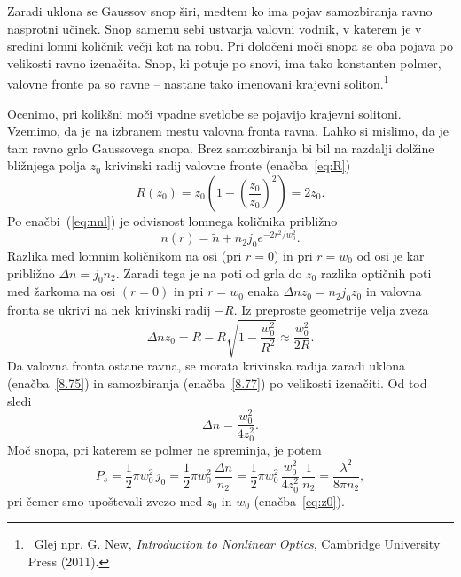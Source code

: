 Zaradi uklona se Gaussov snop širi, medtem ko ima pojav samozbiranja ravno nasprotni
učinek. Snop samemu sebi ustvarja valovni vodnik, v katerem je v sredini lomni količnik 
večji kot na robu. Pri določeni moči snopa se oba pojava po
velikosti ravno izenačita. Snop, ki potuje po snovi, ima tako konstanten polmer, 
valovne fronte pa so ravne -- nastane tako imenovani krajevni soliton.\footnote{~Glej npr. G. New, {\it Introduction
to Nonlinear Optics}, Cambridge University Press (2011).}

Ocenimo, pri kolikšni moči vpadne svetlobe se pojavijo krajevni solitoni. 
Vzemimo, da je na izbranem mestu valovna fronta ravna. Lahko si mislimo,
da je tam ravno grlo Gaussovega snopa. Brez samozbiranja bi bil na razdalji
dolžine bližnjega polja $z_{0}$ krivinski radij valovne fronte (enačba~\ref{eq:R})
\begin{equation}
R(z_{0})=z_{0}\left( 1+\left(\frac{z_{0}}{z_{0}}\right)^{2}\right)=2z_{0}.
\label{8.75}
\end{equation}
Po enačbi~(\ref{eq:nnl}) je odvisnost lomnega količnika približno
\begin{equation}
n(r)=\tilde{n}+n_2 j_0 e^{-2r^2/w_0^2}.
\label{8.76}
\end{equation}
Razlika med lomnim količnikom na osi (pri $r=0$) in pri $r = w_{0}$ 
od osi je kar približno $\Delta n= j_{0} n_{2}$.
Zaradi tega je na poti od grla do $z_0$ razlika optičnih poti med žarkoma na osi $(r=0)$ in 
pri $r= w_{0}$ enaka $\Delta nz_{0} = n_2 j_0 z_0$ in valovna fronta se 
ukrivi na nek krivinski radij $-R$. Iz preproste geometrije velja zveza 
\begin{equation}
\Delta nz_{0}=R-R\sqrt{1-\frac{w_{0}^{2}}{R^{2}}}\approx \frac{w_{0}^{2}}{2R}.
\label{8.77}
\end{equation}
Da valovna fronta ostane ravna, se morata krivinska radija zaradi uklona 
(enačba~\ref{8.75}) in samozbiranja (enačba~\ref{8.77}) po velikosti izenačiti. 
Od tod sledi 
\begin{equation}
\Delta n=\frac{w_{0}^{2}}{4z_{0}^{2}}.
\label{8.78}
\end{equation}
Moč snopa, pri katerem se polmer ne spreminja, je potem 
\begin{equation}
P_{s}= \frac{1}{2}\pi w_0^2 \,j_0 = \frac{1}{2}\pi w_0^2 \, \frac{\Delta n}{n_2} = 
\frac{1}{2}\pi w_0^2 \,\frac{w_{0}^{2}}{4z_{0}^{2}}\,\frac{1}{n_2} = \frac{\lambda^2}{8\pi n_2},
\label{8.79}
\end{equation}
pri čemer smo upoštevali zvezo med $z_0$ in $w_0$ (enačba~\ref{eq:z0}).


